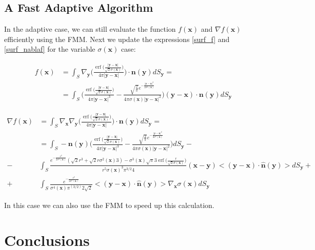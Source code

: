 \documentclass[11pt]{article}
\DeclareMathOperator\erf{erf}
\newcommand\bx{\boldsymbol x}
\newcommand\by{\boldsymbol y}
\newcommand\bn{\boldsymbol n}
\begin{document}
\subsection{A Fast Adaptive Algorithm}
\label{sec:fast-adap}

In the adaptive case, we can still evaluate the function $f(\bx)$ and
$\nabla f(\bx)$ efficiently using the FMM. Next we update the
expressions \ref{surf_f} and \ref{surf_nablaf} for the variable
$\sigma(\bx)$ case:

 
\begin{equation}
\begin{aligned}
f(\bx)&=\int_{\mathit{S}}\nabla_{\by}\Big(\frac{\erf\big(\frac{|\by-\bx|}{\sqrt{2}\sigma(\bx)}\big)}{4\pi|\by-\bx|}\Big)\cdot\bn(\by)dS_{\by}=\\
&=\int_{\mathit{S}}\Bigg(\frac{\erf\big(\frac{|\by-\bx|}{\sqrt{2}\sigma(\bx)}\big)}{4\pi|\by-\bx|^3}-\frac{\sqrt{\frac{2}{\pi}}e^{-\frac{|\by-\bx|^2}{2\sigma^2(\bx)}}}{4\pi\sigma(\bx)|\by-\bx|^2}\Bigg)(\by-\bx)\cdot\bn(\by)dS_{\by}
\end{aligned}
\end{equation}

\begin{equation}
\begin{aligned}
\nabla f(\bx)&=\int_{\mathit{S}}\nabla_{\bx}\nabla_{\by}\Big(\frac{\erf\big(\frac{|\by-\bx|}{\sqrt{2}\sigma(\bx)}\big)}{4\pi|\by-\bx|}\Big)\cdot\bn(\by)dS_{\by}=\\
&=\int_{\mathit{S}}-\bn(\by)\Bigg(\frac{\erf\big(\frac{|\by-\bx|}{\sqrt{2}\sigma(\bx)}\big)}{4\pi|\by-\bx|^3}-\frac{\sqrt{\frac{2}{\pi}}e^{-\frac{|\by-\bx|^2}{2\sigma^2(\bx)}}}{4\pi\sigma(\bx)|\by-\bx|^2}\Bigg)dS_{\by}-\\
-&\int_{\mathit{S}} \frac{e^{-\frac{r^2}{2\sigma^2(\bx)}}(\sqrt{2}r^3+\sqrt{2}r\sigma^2(\bx)3)-\sigma^3(\bx)\sqrt{\pi}3\erf{\big(\frac{r}{\sqrt{2}\sigma(\bx)}}\big)}{r^5\sigma(\bx)^3\pi^{3/2}4}(\bx-\by)<(\by-\bx)\cdot \hat{\bn}(\by)>dS_{\by}+\\
+&\int_{\mathit{S}} \frac{e^{-\frac{r^2}{2\sigma^2(\bx)}}}{\sigma^4(\bx)\pi^(3/2)2\sqrt{2}}<(\by-\bx)\cdot \hat{\bn}(\by)>\nabla_{\bx}\sigma(\bx)dS_{\by}
\end{aligned}
\end{equation}

In this case we can also use the FMM to speed up this calculation.






\section{Conclusions}































  
\end{document}
